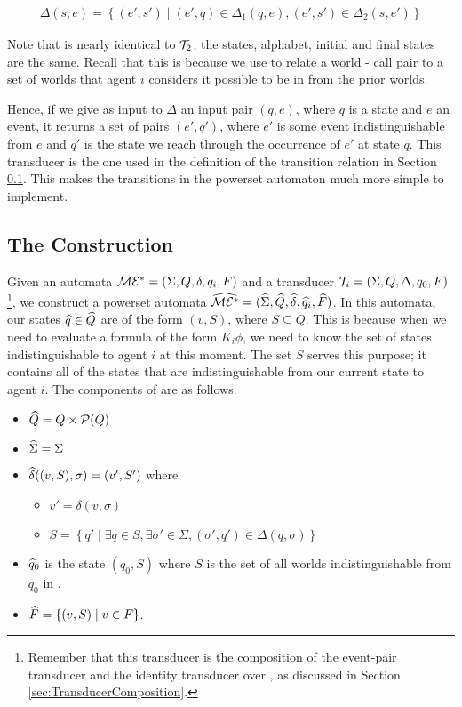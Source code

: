 \documentclass[10pt, a4paper]{report}
\begin{document}
\begin{align*}
  \Delta(s, e) = \left\{ (e', s') \mid (e', q) \in \Delta_1(q, e), (e', s') \in \Delta_2(s, e') \right\} 
\end{align*}

Note that  is nearly identical to $\mathcal{T}_2$; the states, alphabet,
initial and final states are the same. Recall that this is because we use
 to relate a world - call pair to a set of worlds that agent $i$
considers it possible to be in from the prior worlds. 

Hence, if we give as input to $\Delta$ an input pair $(q, e)$, where $q$ is a
state and $e$ an event, it returns a set of pairs $(e', q')$, where $e'$ is some
event indistinguishable from $e$ and $q'$ is the state we reach through the
occurrence of $e'$ at state $q$. This transducer is the one used in the
definition of the transition relation in Section \ref{sec:Powerset}. This makes
the transitions in the powerset automaton much more simple to implement.

\subsection{The Construction}
\label{sec:Powerset}

Given an automata $\mathcal{ME^\ast} = (\Sigma, Q, \delta, q_i, F)$ and a transducer
$\mathcal{T}_i = (\Sigma, Q, \Delta, q_0, F)$\footnote{Remember that this transducer
  is the composition of the event-pair transducer and the identity transducer
  over \mestar, as discussed in Section \ref{sec:TransducerComposition}.}, we construct a powerset
automata $\widehat{\mathcal{ME^\ast}} = (\widehat{\Sigma}, \widehat{Q}, \widehat{\delta}, \widehat{q}_i,
\widehat{F})$. In this automata, our states $\widehat{q} \in \widehat{Q}$ are of the form $(v,
S)$, where $S \subseteq Q$. This is because when we need to evaluate a formula
of the form $K_i\phi$, we need to know the set of states indistinguishable
to agent $i$ at this moment. The set $S$ serves this purpose; it contains all of
the states that are indistinguishable from our current state to agent $i$. The
components of \mestar are as follows. 

\begin{itemize}
\item $\widehat{Q} = Q \times \mathcal{P}(Q)$
\item $\widehat{\Sigma} = \Sigma$ 
\item $\widehat{\delta}((v, S), \sigma) = (v', S')$ where
  \begin{itemize}
  \item $v' =  \delta(v, \sigma)$
  \item $S = \left\{q' \mid \exists q \in S, \exists \sigma' \in \Sigma,
      (\sigma', q') \in \Delta(q, \sigma) \right\}$
  \end{itemize}
\item $\widehat{q}_0$ is the state $(q_0, S)$ where $S$ is the set of all worlds
  indistinguishable from $q_0$ in \mestar.
\item $\widehat{F} = \left\{ (v, S) \mid v \in F \right\}$.
\end{itemize}
\end{document}
